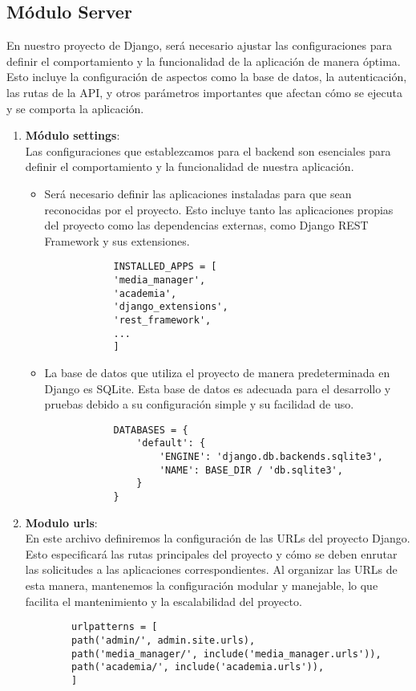 \subsection*{Módulo Server}
En nuestro proyecto de Django, será necesario ajustar las configuraciones para definir el comportamiento y la funcionalidad de la aplicación de manera óptima. Esto incluye la configuración de aspectos como la base de datos, la autenticación, las rutas de la API, y otros parámetros importantes que afectan cómo se ejecuta y se comporta la aplicación.
\begin{enumerate}
	\item \textbf{Módulo settings}: \\
	Las configuraciones que establezcamos para el backend son esenciales para definir el comportamiento y la funcionalidad de nuestra aplicación.
	\begin{itemize}
		\item Será necesario definir las aplicaciones instaladas para que sean reconocidas por el proyecto. Esto incluye tanto las aplicaciones propias del proyecto como las dependencias externas, como Django REST Framework y sus extensiones.
		\begin{verbatim}
			INSTALLED_APPS = [
			'media_manager',
			'academia',
			'django_extensions',
			'rest_framework',
			...
			]
		\end{verbatim}
		\item La base de datos que utiliza el proyecto de manera predeterminada en Django es SQLite. Esta base de datos es adecuada para el desarrollo y pruebas debido a su configuración simple y su facilidad de uso.
		\begin{verbatim}
			DATABASES = {
				'default': {
					'ENGINE': 'django.db.backends.sqlite3',
					'NAME': BASE_DIR / 'db.sqlite3',
				}
			}
		\end{verbatim}	
	\end{itemize}
	\item \textbf{Modulo urls}: \\ 
	En este archivo definiremos la configuración de las URLs del proyecto Django. Esto especificará las rutas principales del proyecto y cómo se deben enrutar las solicitudes a las aplicaciones correspondientes. Al organizar las URLs de esta manera, mantenemos la configuración modular y manejable, lo que facilita el mantenimiento y la escalabilidad del proyecto.
	\begin{verbatim}
		urlpatterns = [
		path('admin/', admin.site.urls),
		path('media_manager/', include('media_manager.urls')),
		path('academia/', include('academia.urls')),
		]
	\end{verbatim}
\end{enumerate}

